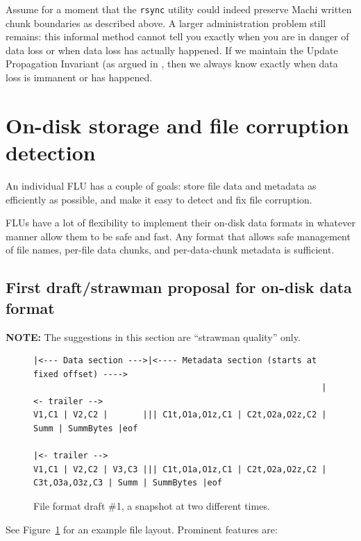 \documentclass[preprint,10pt]{sigplanconf}
\begin{document}
Assume for a moment that the {\tt rsync} utility could indeed preserve
Machi written chunk boundaries as described above.  A larger
administration problem still remains: this informal method cannot tell
you exactly when you are in danger of data loss or when data loss has
actually happened.  If we maintain the Update Propagation Invariant
(as argued in \cite{machi-chain-manager-design},
then we always know exactly when data loss is immanent or has happened.

\section{On-disk storage and file corruption detection}
\label{sec:on-disk}

An individual FLU has a couple of goals: store file data and metadata
as efficiently as possible, and make it easy to detect and fix file
corruption.

FLUs have a lot of flexibility to implement their on-disk data formats in
whatever manner allow them to be safe and fast.  Any format that
allows safe management of file names, per-file data chunks, and
per-data-chunk metadata is sufficient.

\subsection{First draft/strawman proposal for on-disk data format}
\label{sub:on-disk-data-format}

{\bf NOTE:} The suggestions in this section are ``strawman quality''
only.

\begin{figure}
\begin{verbatim}
|<--- Data section --->|<---- Metadata section (starts at fixed offset) ---->
                                                          |<- trailer -->
V1,C1 | V2,C2 |       ||| C1t,O1a,O1z,C1 | C2t,O2a,O2z,C2 | Summ | SummBytes |eof
                                                                           |<- trailer -->
V1,C1 | V2,C2 | V3,C3 ||| C1t,O1a,O1z,C1 | C2t,O2a,O2z,C2 | C3t,O3a,O3z,C3 | Summ | SummBytes |eof
\end{verbatim}
\caption{File format draft \#1, a snapshot at two different times.}
\label{fig:file-format-d1}
\end{figure}

See Figure~\ref{fig:file-format-d1} for an example file layout.
Prominent features are:
\end{document}
